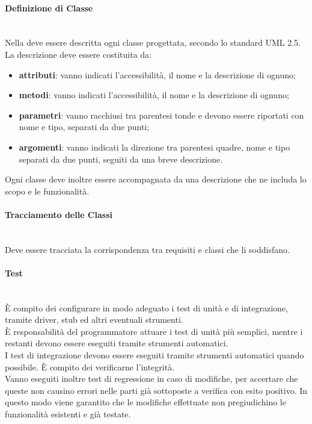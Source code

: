 \paragraph{Definizione di Classe}\mbox{}\\
Nella \DefinizioneDiProdotto{} deve essere descritta ogni classe progettata, secondo lo standard UML 2.5. La descrizione deve essere costituita da:
\begin{itemize}
	\item \textbf{attributi}: vanno indicati l'accessibilità, il nome e la descrizione di ognuno;
	\item \textbf{metodi}: vanno indicati l'accessibilità, il nome e la descrizione di ognuno;
	\item \textbf{parametri}: vanno racchiusi tra parentesi tonde e devono essere riportati con nome e tipo, separati da due punti;
	\item \textbf{argomenti}: vanno indicati la direzione tra parentesi quadre, nome e tipo separati da due punti, seguiti da una breve descrizione.
\end{itemize}
Ogni classe deve inoltre essere accompagnata da una descrizione che ne includa lo scopo e le funzionalità.

\paragraph{Tracciamento delle Classi}\mbox{}\\
Deve essere tracciata la corrispondenza tra requisiti e classi che li soddisfano.

\paragraph{Test}\mbox{}\\
È compito dei \Progettisti{} configurare in modo adeguato i test di unità e di integrazione, tramite driver, stub ed altri eventuali strumenti.\\
È responsabilità del programmatore attuare i test di unità più semplici, mentre i restanti devono essere eseguiti tramite strumenti automatici.\\
I test di integrazione devono essere eseguiti tramite strumenti automatici quando possibile. È compito dei \Verificatori{} verificarne l'integrità.\\
Vanno eseguiti inoltre test di regressione in caso di modifiche, per accertare che queste non causino errori nelle parti già sottoposte a verifica con esito positivo. In questo modo viene garantito che le modifiche effettuate non pregiudichino le funzionalità esistenti e già testate.

